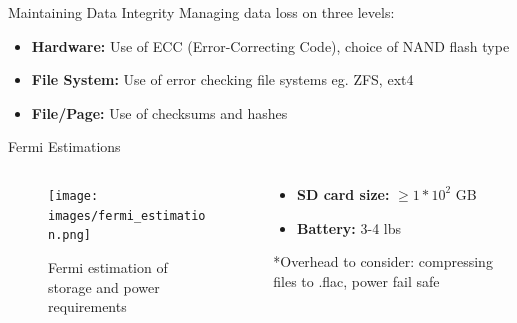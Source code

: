 \begin{frame}{Maintaining Data Integrity}
    Managing data loss on three levels:
    \begin{itemize}
        \item \textbf{Hardware:} Use of ECC (Error-Correcting Code), choice of NAND flash type
        \item \textbf{File System:} Use of error checking file systems eg. ZFS, ext4
        \item \textbf{File/Page:} Use of checksums and hashes
    \end{itemize}
\end{frame}

\begin{frame}{Fermi Estimations}
    \begin{columns}
        \begin{column}{0.5\textwidth}
            \begin{figure}
                \centering
                \texttt{[image: images/fermi\_estimation.png]}
                \caption{Fermi estimation of storage and power requirements}
            \end{figure}
       \end{column}
        \begin{column}{0.5\textwidth}
            \begin{itemize}
            \item \textbf{SD card size:} $\ge1*10^2$ GB
            \item \textbf{Battery:} 3-4 lbs
            \end{itemize}
            *Overhead to consider: compressing files to .flac, power fail safe
        \end{column}
    \end{columns}
\end{frame}

